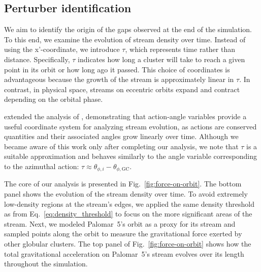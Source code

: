     \subsection{Perturber identification} \label{sec:Perturber_Identification}
        We aim to identify the origin of the gaps observed at the end of the simulation. To this end, we examine the evolution of stream density over time. Instead of using the x'-coordinate, we introduce $\tau$, which represents time rather than distance. Specifically, $\tau$ indicates how long a cluster will take to reach a given point in its orbit or how long ago it passed. This choice of coordinates is advantageous because the growth of the stream is approximately linear in $\tau$. In contrast, in physical space, streams on eccentric orbits expand and contract depending on the orbital phase.

        \citet{2016MNRAS.457.3817S} extended the analysis of \citet{2015MNRAS.450.1136E}, demonstrating that action-angle variables provide a useful coordinate system for analyzing stream evolution, as actions are conserved quantities and their associated angles grow linearly over time. Although we became aware of this work only after completing our analysis, we note that $\tau$ is a suitable approximation and behaves similarly to the angle variable corresponding to the azimuthal action: $\tau \approx \theta_{\phi, i} - \theta_{\phi,\text{GC}}$.

        The core of our analysis is presented in Fig.~\ref{fig:force-on-orbit}. The bottom panel shows the evolution of the stream density over time. To avoid extremely low-density regions at the stream's edges, we applied the same density threshold as from Eq.~\ref{eq:density_threshold} to focus on the more significant areas of the stream. Next, we modeled Palomar~5's orbit as a proxy for its stream and sampled points along the orbit to measure the gravitational force exerted by other globular clusters. The top panel of Fig.~\ref{fig:force-on-orbit} shows how the total gravitational acceleration on Palomar~5's stream evolves over its length throughout the simulation.

